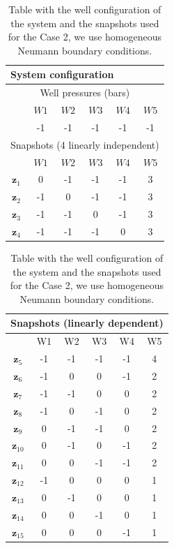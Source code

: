 \documentclass[12pt]{article}
\begin{document}
\begin{table}[!ht]\centering
\begin{minipage}{.45\textwidth}
\vspace{-10pt}
\centering
\begin{tabular}{ |c|c|c|c|c|c|} 
 \hline
  \multicolumn{6}{|l|}{System configuration} \\ 
  \hline
  \multicolumn{6}{|c|}{Well pressures (bars)}\\
  \hline
  &$W1$ &$W2$ &$W3$ &$W4$ &$W5$ \\
  \hline
&-1 & -1& -1& -1& -1\\
\hline
\multicolumn{6}{|l|}{Snapshots (4 linearly independent)} \\
\hline
 &$W1$ &$W2$ &$W3$ &$W4$ &$W5$ \\
  \hline

$\mathbf{z}_1$& 0&-1 &-1 &-1 &3 \\
$\mathbf{z}_2$& -1&0 &-1 &-1 &3  \\
$\mathbf{z}_3$& -1&-1 &0 &-1 &3  \\
$\mathbf{z}_4$& -1&-1 &-1 &0 &3  \\
 \hline
 \end{tabular}
\label{table:case2}\end{minipage}%
\hspace{10pt}
 \begin{minipage}{.45\textwidth}
 \begin{tabular}{ |c|c|c|c|c|c|} 
 \hline
 \multicolumn{6}{|l|}{Snapshots (linearly dependent)} \\
\hline
 &W1 &W2 &W3 &W4 &W5 \\
  \hline
$\mathbf{z}_5$& -1&-1 &-1 &-1 &4  \\
$\mathbf{z}_6$& -1&0 &0 &-1 &2  \\
$\mathbf{z}_7$& -1&-1 &0 &0 &2  \\
$\mathbf{z}_8$& -1&0 &-1 &0 &2  \\
$\mathbf{z}_9$& 0&-1 &-1 &0 &2  \\
$\mathbf{z}_{10}$& 0&-1 &0 &-1 &2  \\
$\mathbf{z}_{11}$& 0&0 &-1 &-1 &2  \\
$\mathbf{z}_{12}$& -1&0 &0 &0 &1  \\
$\mathbf{z}_{13}$& 0&-1 &0 &0 &1  \\
$\mathbf{z}_{14}$& 0&0 &-1 &0 &1  \\
$\mathbf{z}_{15}$& 0&0 &0 &-1 &1  \\
 \hline
 \end{tabular}

\label{table:case2}\end{minipage}\caption{Table with the well configuration of the system and the snapshots used for the Case 2, we use homogeneous Neumann boundary conditions.}
\vspace{-10pt}
\end{table}
\end{document}
